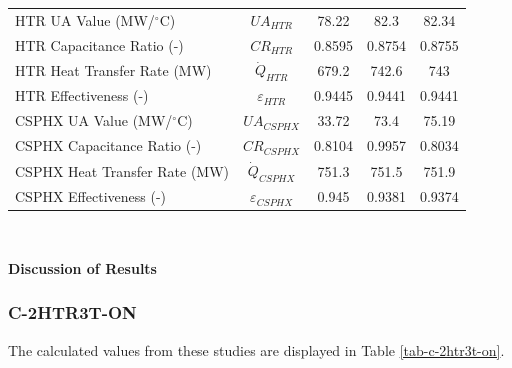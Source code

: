 \begin{paracol}{2}
\begin{specialtable}[H]
\begin{tabular}{lcccc}
    HTR UA Value (MW/$^{\circ}$C)	&	$UA_{HTR}$	&	78.22	&	82.3	&	82.34	\\
    HTR Capacitance Ratio (-)	&	$CR_{HTR}$	&	0.8595	&	0.8754	&	0.8755	\\
    HTR Heat Transfer Rate (MW)	&	$\dot{Q}_{HTR}$	&	679.2	&	742.6	&	743	\\
    HTR Effectiveness (-)	&	$\varepsilon_{HTR}$	&	0.9445	&	0.9441	&	0.9441	\\
    CSPHX UA Value (MW/$^{\circ}$C)	&	$UA_{CSPHX}$	&	33.72	&	73.4	&	75.19	\\
    CSPHX Capacitance Ratio (-)	&	$CR_{CSPHX}$	&	0.8104	&	0.9957	&	0.8034	\\
    CSPHX Heat Transfer Rate (MW)	&	$\dot{Q}_{CSPHX}$	&	751.3	&	751.5	&	751.9	\\
    CSPHX Effectiveness (-)	&	$\varepsilon_{CSPHX}$	&	0.945	&	0.9381	&	0.9374	\\
    \bottomrule
    \end{tabular}\\
\end{specialtable}

\textbf{Discussion of Results}


\subsubsection{C-2HTR3T-ON}

The calculated values from these studies are displayed in Table \ref{tab-c-2htr3t-on}.


\end{paracol}
